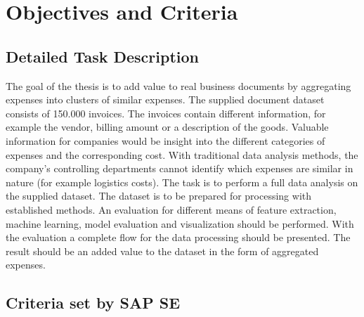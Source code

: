 \chapter{Objectives and Criteria}
\section{Detailed Task Description}
The goal of the thesis is to add value to real business documents by aggregating expenses into clusters of similar expenses. The supplied document dataset consists of 150.000 invoices. The invoices contain different information, for example the vendor, billing amount or a description of the goods. Valuable information for companies would be insight into the different categories of expenses and the corresponding cost. With traditional data analysis methods, the company’s controlling departments cannot identify which expenses are similar in nature (for example logistics costs). 
The task is to perform a full data analysis on the supplied dataset. The dataset is to be prepared for processing with established methods. An evaluation for different means of feature extraction, machine learning, model evaluation and visualization should be performed. With the evaluation a complete flow for the data processing should be presented. The result should be an added value to the dataset in the form of aggregated expenses.

\section{Criteria set by SAP SE}